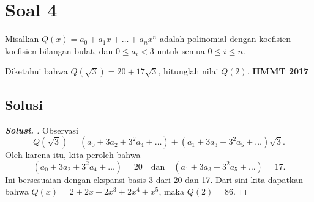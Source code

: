 \documentclass[12pt]{scrartcl}
\begin{document}
\newpage
\section{Soal 4} Misalkan $Q(x) = a_0 + a_1x + \dots + a_nx^n$ adalah polinomial dengan koefisien-koefisien bilangan bulat, dan $0 \le a_i < 3$ untuk semua $0 \le i \le n$.

Diketahui bahwa $Q(\sqrt{3}) = 20 + 17\sqrt{3}$, hitunglah nilai $Q(2)$.
\newline
\textbf{HMMT 2017}

\subsection{Solusi}
\begin{proof}[\textbf{Solusi. }] 
Observasi
\[ Q(\sqrt{3}) = (a_0 + 3a_2 + 3^2a_4 + \dots) + (a_1 + 3a_3 + 3^2a_5 + \dots)\sqrt{3}. \]
Oleh karena itu, kita peroleh bahwa
\[ (a_0 + 3a_2 + 3^2a_4 + \dots) = 20 \quad \text{dan} \quad (a_1 + 3a_3 + 3^2a_5 + \dots) = 17. \]
Ini bersesuaian dengan ekspansi basis-3 dari 20 dan 17. Dari sini kita dapatkan bahwa $Q(x) = 2+2x+2x^3+2x^4+x^5$, maka $Q(2) = 86$.
\end{proof}
\end{document}
